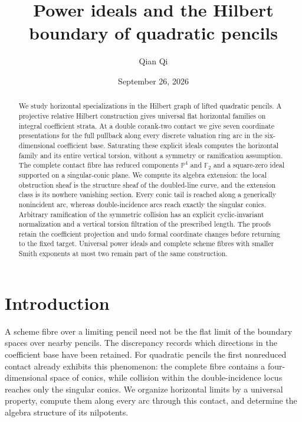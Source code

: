 \documentclass[11pt,reqno]{amsart}
\numberwithin{equation}{section}
\theoremstyle{definition}\newtheorem{definition}[theorem]{Definition}
\theoremstyle{remark}\newtheorem{remark}[theorem]{Remark}
\newcommand{\Pj}{\mathbb P}\newcommand{\A}{\mathbb A}
\begin{document}
\title{Power ideals and the Hilbert boundary of quadratic pencils}
\author{Qian Qi}
\date{September 26, 2026}
\begin{abstract}
We study horizontal specializations in the Hilbert graph of lifted
quadratic pencils. A projective relative Hilbert construction gives
universal flat horizontal families on integral coefficient strata.
At a double corank-two contact we give seven coordinate presentations
for the full pullback along every discrete valuation ring arc in the
six-dimensional coefficient base. Saturating these explicit ideals
computes the horizontal family and its entire vertical torsion,
without a symmetry or ramification assumption. The complete contact
fibre has reduced components $\Pj^4$ and $\mathbb F_2$ and a
square-zero ideal supported on a singular-conic plane. We compute
its algebra extension: the local obstruction sheaf is the structure
sheaf of the doubled-line curve, and the extension class is its
nowhere vanishing section. Every conic tail is reached along a
generically nonincident arc, whereas double-incidence arcs reach
exactly the singular conics. Arbitrary ramification of the symmetric
collision has an explicit cyclic-invariant normalization and a
vertical torsion filtration of the prescribed length. The proofs
retain the coefficient projection and undo formal coordinate changes
before returning to the fixed target. Universal power ideals and
complete scheme fibres with smaller Smith exponents at most two
remain part of the same construction.
\end{abstract}
\maketitle
\section{Introduction}
\label{sec:paper-ii-v164}\label{sec:paper-ii-v166}
A scheme fibre over a limiting pencil need not be the flat limit
of the boundary spaces over nearby pencils. The discrepancy records
which directions in the coefficient base have been retained.
For quadratic pencils the first nonreduced contact already exhibits
this phenomenon: the complete fibre contains a four-dimensional
space of conics, while collision within the double-incidence locus
reaches only the singular conics. We organize horizontal limits by
a universal property, compute them along every arc through this
contact, and determine the algebra structure of its nilpotents.
\end{document}
